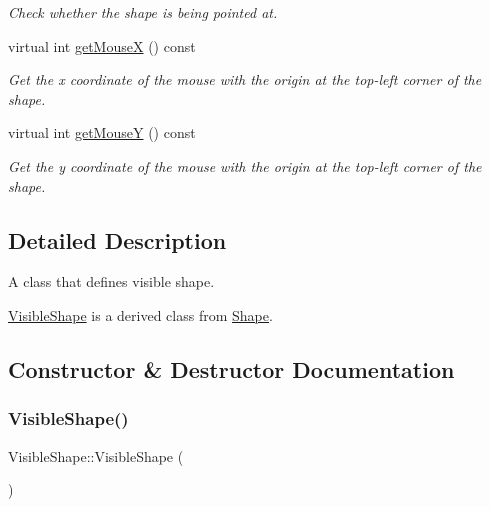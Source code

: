 \begin{DoxyCompactItemize}
\begin{DoxyCompactList}\small\item\em Check whether the shape is being pointed at. \end{DoxyCompactList}\item 
virtual int \mbox{\hyperlink{class_visible_shape_a53dd71f6cee05f9707d899c4e1434070}{get\+MouseX}} () const
\begin{DoxyCompactList}\small\item\em Get the x coordinate of the mouse with the origin at the top-\/left corner of the shape. \end{DoxyCompactList}\item 
virtual int \mbox{\hyperlink{class_visible_shape_a6b0536f0437e514ba1bda6927becb603}{get\+MouseY}} () const
\begin{DoxyCompactList}\small\item\em Get the y coordinate of the mouse with the origin at the top-\/left corner of the shape. \end{DoxyCompactList}\end{DoxyCompactItemize}


\subsection{Detailed Description}
A class that defines visible shape. 

\mbox{\hyperlink{class_visible_shape}{Visible\+Shape}} is a derived class from \mbox{\hyperlink{class_shape}{Shape}}. 

\subsection{Constructor \& Destructor Documentation}
\mbox{\label{class_visible_shape_a280deeca2a39d227887ff2e13b009c0a}} 
\subsubsection{\texorpdfstring{Visible\+Shape()}{VisibleShape()}\hspace{0.1cm}{\footnotesize\ttfamily [1/3]}}
{\footnotesize\ttfamily Visible\+Shape\+::\+Visible\+Shape (\begin{DoxyParamCaption}{ }\end{DoxyParamCaption})}

